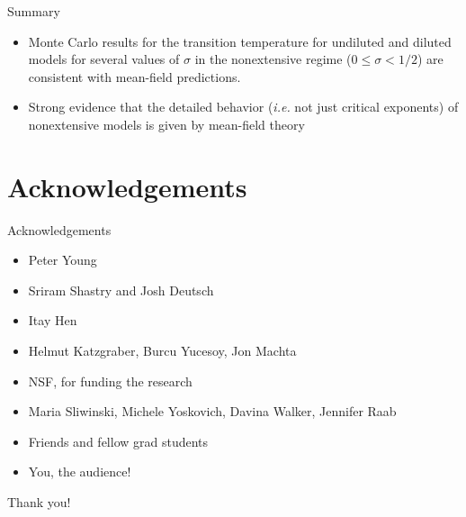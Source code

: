 \documentclass{beamer}
\begin{document}
\begin{frame}{Summary}

  \begin{itemize}
  \item
    Monte Carlo results for the transition temperature for undiluted and
    diluted models for several values of $\sigma$ in the nonextensive regime
    ($0 \leq \sigma < 1/2$) are \alert{consistent with mean-field predictions.}
  \item
    Strong evidence that the detailed behavior (\textit{i.e.} not just critical
    exponents) of nonextensive models is given by mean-field theory
  \end{itemize}
\end{frame}

\section*{Acknowledgements}

\begin{frame}{Acknowledgements}
  \begin{itemize}
    \item Peter Young
    \item Sriram Shastry and Josh Deutsch
    \item Itay Hen
    \item Helmut Katzgraber, Burcu Yucesoy, Jon Machta
    \item NSF, for funding the research
    \item Maria Sliwinski, Michele Yoskovich, Davina Walker, Jennifer Raab
    \item Friends and fellow grad students
    \pause
    \item You, the audience!
  \end{itemize}
  \centering\Huge
  Thank you!
\end{frame}
\end{document}
